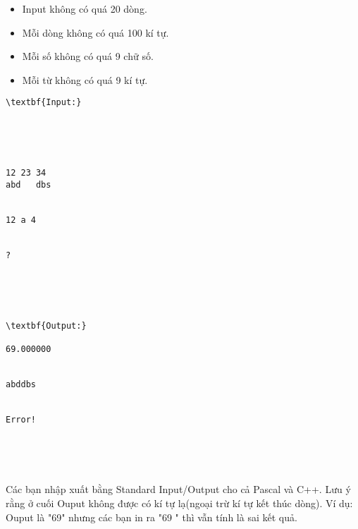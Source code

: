 \begin{itemize}
	\item     Input không có quá 20 dòng.   
	\item     Mỗi dòng không có quá 100 kí tự.   
	\item     Mỗi số không có quá 9 chữ số.   
	\item     Mỗi từ không có quá 9 kí tự.   
\end{itemize}
\begin{verbatim}
\textbf{Input:}





12 23 34
abd   dbs


12 a 4 


?





\textbf{Output:}

69.000000


abddbs


Error! 





\end{verbatim}

Các bạn nhập xuất bằng Standard Input/Output cho cả Pascal và C++. Lưu ý rằng ở cuối Ouput không được có kí tự lạ(ngoại trừ kí tự kết thúc dòng). Ví dụ: Ouput là "69" nhưng các bạn in ra "69 " thì vẫn tính là sai kết quả.
